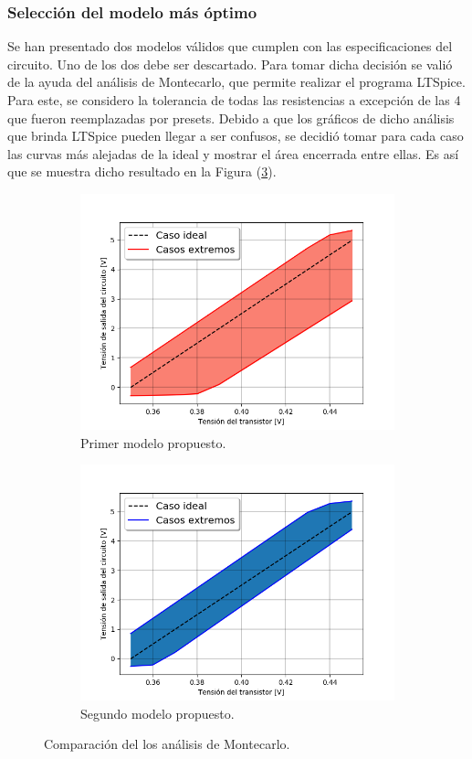 \documentclass[a4paper]{article}
\begin{document}
\subsubsection{Selección del modelo más óptimo}

Se han presentado dos modelos válidos que cumplen con las especificaciones del circuito. Uno de los dos debe ser descartado. Para tomar dicha decisión se valió de la ayuda del análisis de Montecarlo, que permite realizar el programa LTSpice. Para este, se considero la tolerancia de todas las resistencias a excepción de las 4 que fueron reemplazadas por presets. Debido a que los gráficos de dicho análisis que brinda LTSpice pueden llegar a ser confusos, se decidió tomar para cada caso las curvas más alejadas de la ideal y mostrar el área encerrada entre ellas. Es así que se muestra dicho resultado en la Figura (\ref{fig:mccomp}). 

\begin{figure}[H]
\centering
\begin{subfigure}{.8\textwidth}
  \centering
  \includegraphics[width=.85\linewidth]{Ejercicio6/Imagenes/MC-1M.png}
  \caption{Primer modelo propuesto.}
  \label{fig:mcm1}
\end{subfigure}
\begin{subfigure}{\textwidth}
  \centering
  \includegraphics[width=.7\linewidth]{Ejercicio6/Imagenes/MC-2M.png}
  \caption{Segundo modelo propuesto.}
  \label{fig:mcm2}
\end{subfigure}
\caption{Comparación del los análisis de Montecarlo.}
\label{fig:mccomp}
\end{figure}
\end{document}
